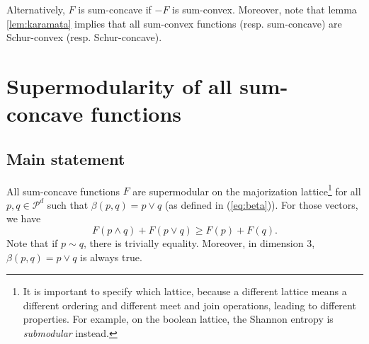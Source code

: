 \noindent Alternatively, $F$ is sum-concave if $-F$ is sum-convex. Moreover, note that lemma \ref{lem:karamata} implies that all sum-convex functions (resp. sum-concave) are Schur-convex (resp. Schur-concave).



\section{Supermodularity of all sum-concave functions} \label{sec:alternative_supermodularity}

\subsection{Main statement}

\begin{theorem} \label{th:alternative_supermodularity}
    All sum-concave functions $F$ are supermodular on the majorization lattice\footnote{It is important to specify which lattice, because a different lattice means a different ordering and different meet and join operations, leading to different properties. For example, on the boolean lattice, the Shannon entropy is \textit{submodular} instead.} for all $p, q \in \mathcal{P}^d$ such that $\beta(p, q) = p \vee q$ (as defined in (\ref{eq:beta})). For those vectors, we have
    \begin{equation} \label{eq:supermodularity}
        F(p \wedge q) + F(p \vee q) \geq F(p) + F(q).
    \end{equation}
    Note that if $p \sim q$, there is trivially equality. Moreover, in dimension 3, $\beta(p, q) = p \vee q$ is always true.
\end{theorem}

